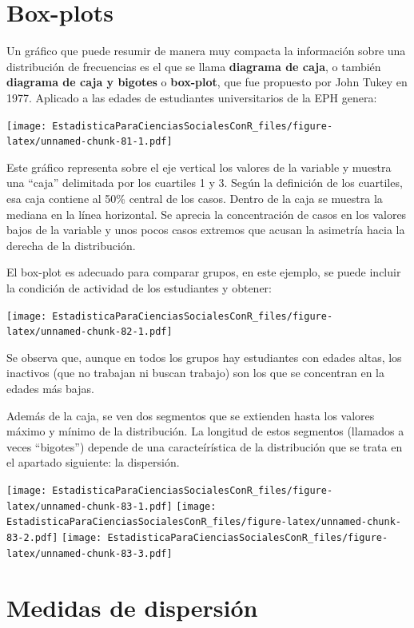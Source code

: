 \documentclass[]{book}
\begin{document}
\hypertarget{box-plots}{%
\section{Box-plots}\label{box-plots}}

Un gráfico que puede resumir de manera muy compacta la información sobre
una distribución de frecuencias es el que se llama \textbf{diagrama de caja},
o también \textbf{diagrama de caja y bigotes} o \textbf{box-plot}, que fue
propuesto por John Tukey en 1977.
Aplicado a las edades de estudiantes universitarios de la EPH genera:

\texttt{[image: EstadisticaParaCienciasSocialesConR\_files/figure-latex/unnamed-chunk-81-1.pdf]}

Este gráfico representa sobre el eje vertical los valores de la variable y muestra una ``caja'' delimitada por los cuartiles 1 y 3. Según la definición de los cuartiles, esa caja contiene al 50\% central de los casos. Dentro de la caja se muestra la mediana en la línea horizontal. Se aprecia la concentración de casos en los valores bajos de la variable y unos pocos casos extremos que acusan la asimetría hacia la derecha de la distribución.

El box-plot es adecuado para comparar grupos, en este ejemplo, se puede incluir la condición de actividad de los estudiantes y obtener:

\texttt{[image: EstadisticaParaCienciasSocialesConR\_files/figure-latex/unnamed-chunk-82-1.pdf]}

Se observa que, aunque en todos los grupos hay estudiantes con edades altas, los inactivos (que no trabajan ni buscan trabajo) son los que se concentran en la edades más bajas.

Además de la caja, se ven dos segmentos que se extienden hasta los
valores máximo y mínimo de la distribución. La longitud de estos segmentos (llamados a veces ``bigotes'') depende de una caracteírística de la distribución que se trata en el apartado siguiente: la
dispersión.

\texttt{[image: EstadisticaParaCienciasSocialesConR\_files/figure-latex/unnamed-chunk-83-1.pdf]} \texttt{[image: EstadisticaParaCienciasSocialesConR\_files/figure-latex/unnamed-chunk-83-2.pdf]} \texttt{[image: EstadisticaParaCienciasSocialesConR\_files/figure-latex/unnamed-chunk-83-3.pdf]}

\hypertarget{medidas-de-dispersion}{%
\section{Medidas de dispersión}\label{medidas-de-dispersion}}
\end{document}

